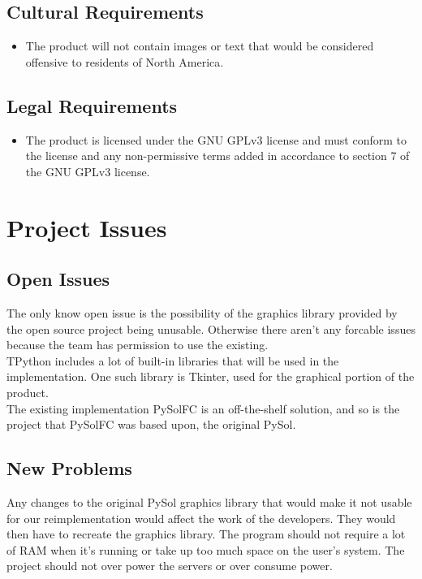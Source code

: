 \documentclass{article}
\begin{document}
		\subsection{Cultural Requirements}
		\begin{itemize}
			\itemsep0em
			\item The product will not contain images or text that would be 
			considered offensive to residents of North America.
		\end{itemize}
		\subsection{Legal Requirements}
		\begin{itemize}
			\itemsep0em
			\item The product is licensed under the GNU GPLv3 license and must 
			conform to the license and any non-permissive terms added in 
			accordance to section 7 of the GNU GPLv3 license.
		\end{itemize}
		
	\section{Project Issues}
		\subsection{Open Issues}
		\indent \indent The only know open issue is the possibility of the graphics library provided by the open source project being unusable. Otherwise there aren't any forcable issues because the team has permission to use the existing.\\
		\indent TPython includes a lot of built-in libraries that will be used in the implementation. One such library is Tkinter, used for the graphical portion of the product.\\
		\indent The existing implementation PySolFC is an off-the-shelf solution, and so is the project that PySolFC was based upon, the original PySol.\\
		\subsection{New Problems}
		\indent \indent Any changes to the original PySol graphics library that would make it not usable for our reimplementation would affect the work of the developers. They would then have to recreate the graphics library. The program should not require a lot of RAM when it’s running or take up too much space on the user’s system. The project should not over power the servers or over consume power.\\
\end{document}
